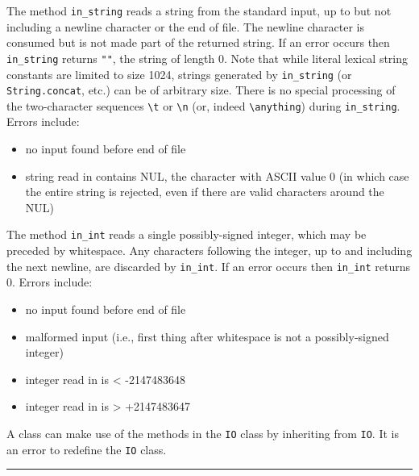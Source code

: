 \documentclass[]{article}
\begin{document}
The method \texttt{in\_string} reads a string from the standard input,
up to but not including a newline character or the end of file. The
newline character is consumed but is not made part of the returned
string. If an error occurs then \texttt{in\_string} returns \texttt{""},
the string of length 0. Note that while literal lexical string constants
are limited to size 1024, strings generated by \texttt{in\_string} (or
\texttt{String.concat}, etc.) can be of arbitrary size. There is no
special processing of the two-character sequences
\texttt{\textbackslash{}t} or \texttt{\textbackslash{}n} (or, indeed
\texttt{\textbackslash{}anything}) during \texttt{in\_string}. Errors
include:

\begin{itemize}
\itemsep1pt\parskip0pt
\item
  no input found before end of file
\item
  string read in contains NUL, the character with ASCII value 0 (in
  which case the entire string is rejected, even if there are valid
  characters around the NUL)
\end{itemize}

The method \texttt{in\_int} reads a single possibly-signed integer,
which may be preceded by whitespace. Any characters following the
integer, up to and including the next newline, are discarded by
\texttt{in\_int}. If an error occurs then \texttt{in\_int} returns 0.
Errors include:

\begin{itemize}
\itemsep1pt\parskip0pt
\item
  no input found before end of file
\item
  malformed input (i.e., first thing after whitespace is not a
  possibly-signed integer)
\item
  integer read in is \textless{} -2147483648
\item
  integer read in is \textgreater{} +2147483647
\end{itemize}

A class can make use of the methods in the \texttt{IO} class by
inheriting from \texttt{IO}. It is an error to redefine the \texttt{IO}
class.

\begin{center}\rule{3in}{0.4pt}\end{center}
\end{document}
